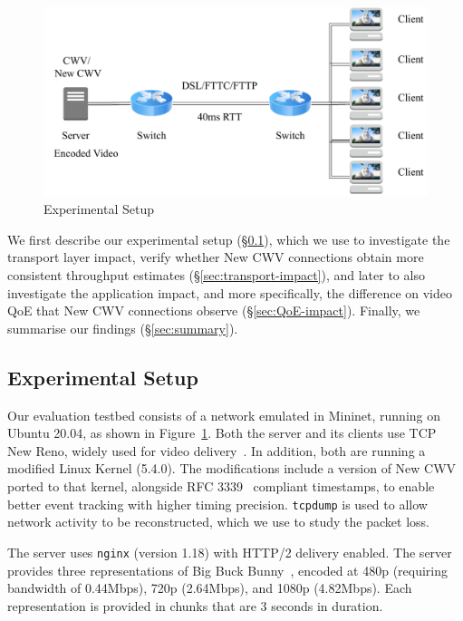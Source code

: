 \documentclass[10pt,sigconf]{acmart}
\begin{document}
\begin{figure}
  \centering
  \includegraphics[width=.5\textwidth]{figures/setup.pdf}
  \caption{Experimental Setup}
  \label{fig:experimental-setup}
\end{figure}

We first describe our experimental setup (\S\ref{sec:experimental-setup}), which we use to investigate the transport layer impact, verify whether New CWV connections obtain more consistent throughput estimates (\S\ref{sec:transport-impact}), and later to also investigate the application impact, and more specifically, the difference on video QoE that New CWV connections observe (\S\ref{sec:QoE-impact}). Finally, we summarise our findings (\S\ref{sec:summary}).

\subsection{Experimental Setup}
\label{sec:experimental-setup}

Our evaluation testbed consists of a network emulated in Mininet, running on Ubuntu 20.04, as shown in Figure~\ref{fig:experimental-setup}. Both the server and its clients use TCP New Reno, widely used for video delivery~\cite{Mishra-2019-the-great-internet-tcp-congestion-control-census}. In addition, both are running a modified Linux Kernel (5.4.0). The modifications include a version of New CWV ported to that kernel, alongside RFC 3339~\cite{rfc3339-precise-timestamps} compliant timestamps, to enable better event tracking with higher timing precision. \texttt{tcpdump} is used to allow network activity to be reconstructed, which we use to study the packet loss.

The server uses \texttt{nginx} (version 1.18) with HTTP/2 delivery enabled. The server provides three representations of Big Buck Bunny~\cite{online-bbb}, encoded at 480p (requiring bandwidth of 0.44Mbps), 720p (2.64Mbps), and 1080p (4.82Mbps). Each representation is provided in chunks that are 3 seconds in duration.
\end{document}
